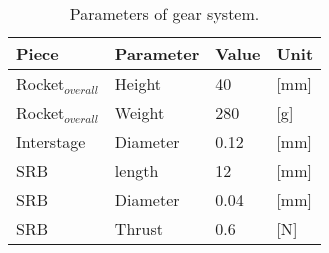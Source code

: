 			
			\begin{table}[htbp]
				\centering
				\begin{tabular}{llll}
					\hline
					Piece & Parameter & Value & Unit \\ \hline
					Rocket$_{overall}$ & Height & 40 & {[}mm{]} \\
					Rocket$_{overall}$ & Weight & 280 & {[}g{]} \\
					Interstage & Diameter & 0.12 & {[}mm{]} \\
					SRB & length & 12 & {[}mm{]} \\
					SRB  & Diameter & 0.04 & {[}mm{]} \\
					SRB & Thrust & 0.6 & {[}N{]}
				\end{tabular}
				\caption{Parameters of gear system.}
				\label{Rocket_measurements}
			\end{table}
			
